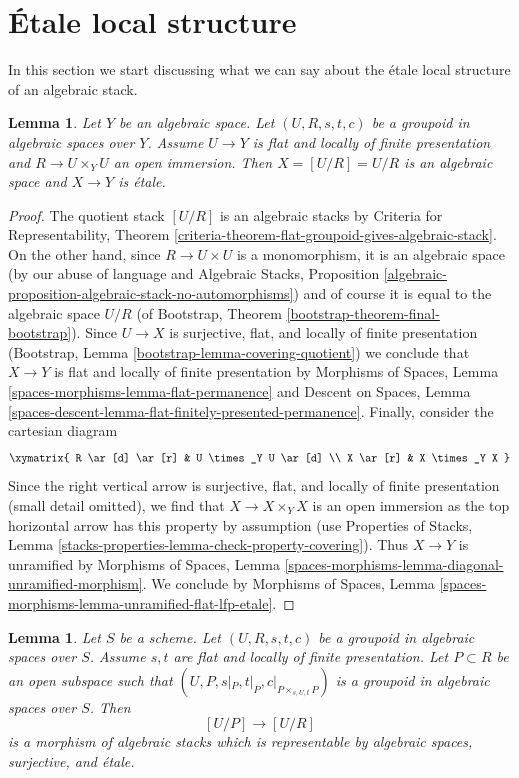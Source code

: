 \documentclass{stacks-project}
\theoremstyle{plain}
\newtheorem{lemma}[subsection]{Lemma}
\theoremstyle{definition}
\theoremstyle{remark}
\numberwithin{equation}{subsection}
\begin{document}
\section{\'Etale local structure}
\label{section-etale-local}

\noindent
In this section we start discussing what we can say
about the \'etale local structure of an algebraic stack.

\begin{lemma}
\label{lemma-quotient-etale}
Let $Y$ be an algebraic space.
Let $(U, R, s, t, c)$ be a groupoid in algebraic spaces over $Y$.
Assume $U \to Y$ is flat and locally of finite presentation
and $R \to U \times_Y U$ an open immersion.
Then $X = [U/R] = U/R$ is an algebraic space and $X \to Y$
is \'etale.
\end{lemma}

\begin{proof}
The quotient stack $[U/R]$ is an algebraic stacks by
Criteria for Representability, Theorem
\ref{criteria-theorem-flat-groupoid-gives-algebraic-stack}.
On the other hand, since $R \to U \times U$ is a monomorphism,
it is an algebraic space (by our abuse of language and
Algebraic Stacks, Proposition
\ref{algebraic-proposition-algebraic-stack-no-automorphisms})
and of course it is equal to the algebraic space $U/R$
(of Bootstrap, Theorem \ref{bootstrap-theorem-final-bootstrap}).
Since $U \to X$ is surjective, flat, and locally of finite presentation
(Bootstrap, Lemma \ref{bootstrap-lemma-covering-quotient})
we conclude that $X \to Y$ is flat and locally of finite presentation by
Morphisms of Spaces, Lemma \ref{spaces-morphisms-lemma-flat-permanence}
and
Descent on Spaces, Lemma
\ref{spaces-descent-lemma-flat-finitely-presented-permanence}.
Finally, consider the cartesian diagram
$$
\xymatrix{
R \ar[d] \ar[r] & U \times_Y U \ar[d] \\
X \ar[r] & X \times_Y X
}
$$
Since the right vertical arrow is surjective, flat, and
locally of finite presentation (small detail omitted), we
find that $X \to X \times_Y X$ is an open immersion as the top horizontal arrow
has this property by assumption (use
Properties of Stacks, Lemma
\ref{stacks-properties-lemma-check-property-covering}).
Thus $X \to Y$ is unramified by
Morphisms of Spaces, Lemma
\ref{spaces-morphisms-lemma-diagonal-unramified-morphism}.
We conclude by
Morphisms of Spaces, Lemma
\ref{spaces-morphisms-lemma-unramified-flat-lfp-etale}.
\end{proof}

\begin{lemma}
\label{lemma-quasi-splitting-etale}
Let $S$ be a scheme.
Let $(U, R, s, t, c)$ be a groupoid in algebraic spaces over $S$.
Assume $s, t$ are flat and locally of finite presentation.
Let $P \subset R$ be an open subspace such that
$(U, P, s|_P, t|_P, c|_{P \times_{s, U, t} P})$ is a
groupoid in algebraic spaces over $S$. Then
$$
[U/P] \longrightarrow [U/R]
$$
is a morphism of algebraic stacks which
is representable by algebraic spaces, surjective, and \'etale.
\end{lemma}
\end{document}
